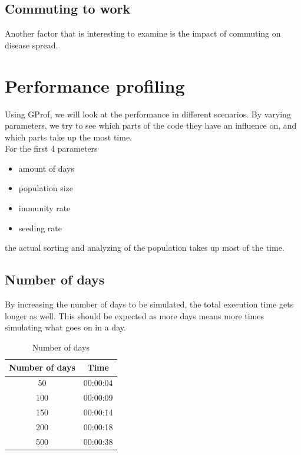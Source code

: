 \documentclass[runningheads]{llncs}
\begin{document}
\subsection{Commuting to work}
Another factor that is interesting to examine is the impact of commuting on disease spread. 

\clearpage
\section{Performance profiling}
Using GProf, we will look at the performance in different scenarios. By varying parameters, we try to see which parts of the code they have an influence on, and which parts take up the most time. 
\\
For the first 4 parameters
\begin{itemize}
	\item amount of days
	\item population size
	\item immunity rate
	\item seeding rate
\end{itemize}
the actual sorting and analyzing of the population takes up most of the time.

\subsection{Number of days}
By increasing the number of days to be simulated, the total execution time gets longer as well. This should be expected as more days means more times simulating what goes on in a day.
\begin{table}[!h]
	\centering
	\begin{tabular}{|c|c|}
		\hline
		Number of days & Time \\\hline
		50  & 00:00:04 \\\hline
    	100 & 00:00:09 \\\hline
    	150 & 00:00:14 \\\hline
    	200	& 00:00:18 \\\hline
    	500 & 00:00:38 \\
    	\hline
	\end{tabular}
	\caption{Number of days}
\end{table}
\end{document}
